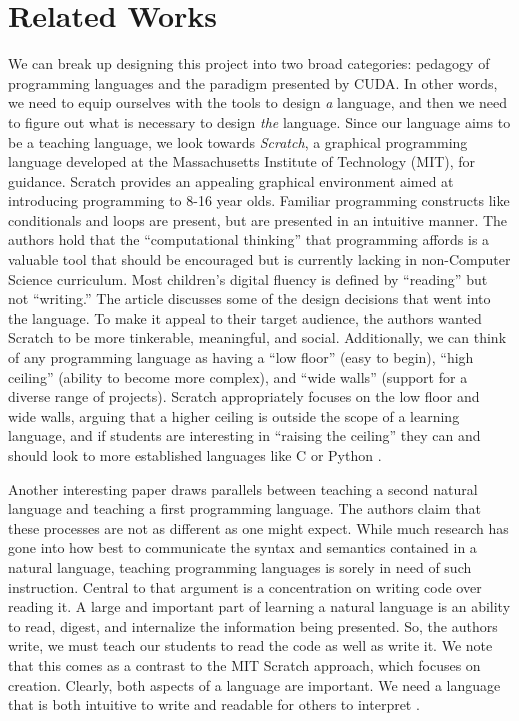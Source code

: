 \documentclass{article}
\begin{document}
\section{Related Works}

We can break up designing this project into two broad categories: pedagogy of programming languages and the paradigm presented by CUDA. In other words, we need to equip ourselves with the tools to design {\em a} language, and then we need to figure out what is necessary to design {\em the} language. Since our language aims to be a teaching language, we look towards {\em Scratch}, a graphical programming language developed at the Massachusetts Institute of Technology (MIT), for guidance. Scratch provides an appealing graphical environment aimed at introducing programming to 8-16 year olds. Familiar programming constructs like conditionals and loops are present, but are presented in an intuitive manner. The authors hold that the ``computational thinking'' that programming affords is a valuable tool that should be encouraged but is currently lacking in non-Computer Science curriculum. Most children's digital fluency is defined by ``reading'' but not ``writing.'' The article discusses some of the design decisions that went into the language. To make it appeal to their target audience, the authors wanted Scratch to be more tinkerable, meaningful, and social. Additionally, we can think of any programming language as having a ``low floor'' (easy to begin), ``high ceiling'' (ability to become more complex), and ``wide walls'' (support for a diverse range of projects). Scratch appropriately focuses on the low floor and wide walls, arguing that a higher ceiling is outside the scope of a learning language, and if students are interesting in ``raising the ceiling'' they can and should look to more established languages like C or Python \cite{resnick}.

Another interesting paper draws parallels between teaching a second natural language and teaching a first programming language. The authors claim that these processes are not as different as one might expect. While much research has gone into how best to communicate the syntax and semantics contained in a natural language, teaching programming languages is sorely in need of such instruction. Central to that argument is a concentration on writing code over reading it. A large and important part of learning a natural language is an ability to read, digest, and internalize the information being presented. So, the authors write, we must teach our students to read the code as well as write it. We note that this comes as a contrast to the MIT Scratch approach, which focuses on creation. Clearly, both aspects of a language are important. We need a language that is both intuitive to write and readable for others to interpret \cite{robertson}.
\end{document}
